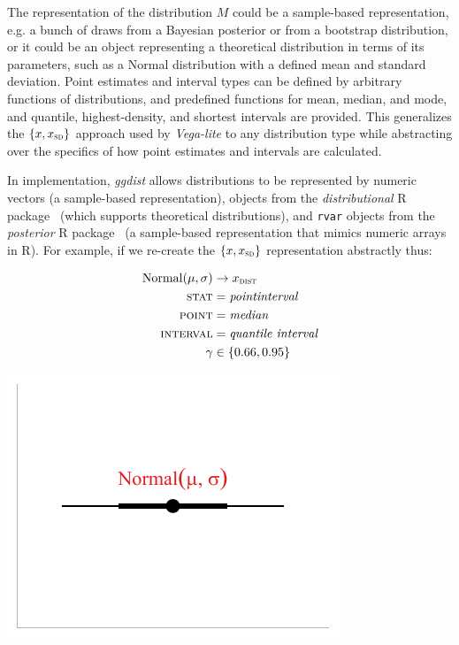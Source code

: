 \documentclass[journal]{vgtc}                     %
\begin{document}
The representation of the distribution $M$ could be a sample-based representation, e.g. a bunch of draws from a Bayesian posterior or from a bootstrap distribution, or it could be an object representing a theoretical distribution in terms of its parameters, such as a Normal distribution with a defined mean and standard deviation. Point estimates and interval types can be defined by arbitrary functions of distributions, and predefined functions for mean, median, and mode, and quantile, highest-density, and shortest intervals are provided. This generalizes the $\{x, x_\textsc{sd}\}$ approach used by \textit{Vega-lite} to any distribution type while abstracting over the specifics of how point estimates and intervals are calculated.

In implementation, \textit{ggdist} allows distributions to be represented by numeric vectors (a sample-based representation), objects from the \textit{distributional } R package~\cite{oharawild2022distributional} (which supports theoretical distributions), and \texttt{rvar} objects from the \textit{posterior} R package~\cite{burkner2022posterior} (a sample-based representation that mimics numeric arrays in R). For example, if we re-create the $\{x, x_\textsc{sd}\}$ representation abstractly thus:

\noindent
\begin{minipage}{.5\columnwidth}

\begin{align*}
\operatorname{Normal}(\mu, \sigma) &\rightarrow x_\textsc{dist}\\
\textsc{stat} &= \mathit{pointinterval}\\
\textsc{point} &= \mathit{median}\\
\textsc{interval} &= \textit{quantile interval}\\
\gamma &\in \{0.66, 0.95\}
\end{align*}
\end{minipage}%
  \begin{minipage}{.4\columnwidth}
    \centering
    \includegraphics[width=1.2\columnwidth]{figs/3-stat_pointinterval_normal.pdf}
  \end{minipage}
\hfill\break
\end{document}
